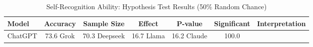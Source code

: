 \begin{table}[ht]
\centering
\footnotesize
\begin{tabular}{lcccccc}
\hline
\textbf{Model} & \textbf{Accuracy} & \textbf{Sample Size} & \textbf{Effect} & \textbf{P-value} & \textbf{Significant} & \textbf{Interpretation} \\
\hline
ChatGPT & 73.6%
Grok & 70.3%
Deepseek & 16.7%
Llama & 16.2%
Claude & 100.0%
\hline
\end{tabular}
\caption{Self-Recognition Ability: Hypothesis Test Results (50\% Random Chance)}
\label{tab:self-recognition-tests}
\end{table}